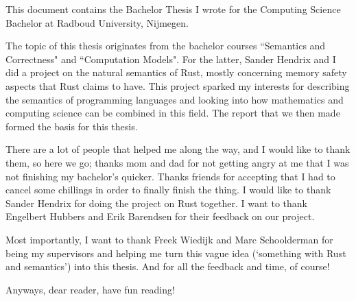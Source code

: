 This document contains the Bachelor Thesis I wrote for the Computing Science Bachelor at Radboud University, Nijmegen. 

The topic of this thesis originates from the bachelor courses ``Semantics and Correctness" and ``Computation Models". For the latter, Sander Hendrix and I did a project on the natural semantics of Rust, mostly concerning memory safety aspects that Rust claims to have. This project sparked my interests for describing the semantics of programming languages and looking into how mathematics and computing science can be combined in this field. The report that we then made formed the basis for this thesis. 

There are a lot of people that helped me along the way, and I would like to thank them, so here we go; thanks mom and dad for not getting angry at me that I was not finishing my bachelor's quicker. Thanks friends for accepting that I had to cancel some chillings in order to finally finish the thing. I would like to thank Sander Hendrix for doing the project on Rust together. I want to thank Engelbert Hubbers and Erik Barendsen for their feedback on our project.

Most importantly, I want to thank Freek Wiedijk and Marc Schoolderman for being my supervisors and helping me turn this vague idea (`something with Rust and semantics') into this thesis. And for all the feedback and time, of course!

Anyways, dear reader, have fun reading!


%

%




